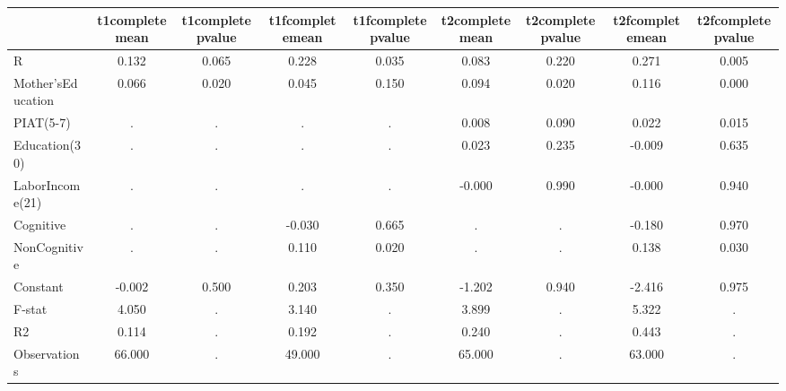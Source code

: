 \begin{table}[htbp]
\begin{tabular}{lcccccccc} \hline \hline
 & t1completemean  & t1completepvalue  & t1fcompletemean  & t1fcompletepvalue  & t2completemean  & t2completepvalue  & t2fcompletemean  & t2fcompletepvalue  \\  \hline 
R &     0.132 &     0.065 &     0.228 &     0.035 &     0.083 &     0.220 &     0.271 &     0.005 \\  
Mother'sEducation &     0.066 &     0.020 &     0.045 &     0.150 &     0.094 &     0.020 &     0.116 &     0.000 \\  
PIAT(5-7) &         . &         . &         . &         . &     0.008 &     0.090 &     0.022 &     0.015 \\  
Education(30) &         . &         . &         . &         . &     0.023 &     0.235 &    -0.009 &     0.635 \\  
LaborIncome(21) &         . &         . &         . &         . &    -0.000 &     0.990 &    -0.000 &     0.940 \\  
Cognitive &         . &         . &    -0.030 &     0.665 &         . &         . &    -0.180 &     0.970 \\  
NonCognitive &         . &         . &     0.110 &     0.020 &         . &         . &     0.138 &     0.030 \\  
Constant &    -0.002 &     0.500 &     0.203 &     0.350 &    -1.202 &     0.940 &    -2.416 &     0.975 \\  
F-stat &     4.050 &         . &     3.140 &         . &     3.899 &         . &     5.322 &         . \\  
R2 &     0.114 &         . &     0.192 &         . &     0.240 &         . &     0.443 &         . \\  
Observations &    66.000 &         . &    49.000 &         . &    65.000 &         . &    63.000 &         . \\  
\hline \hline \end{tabular}
\end{table}
